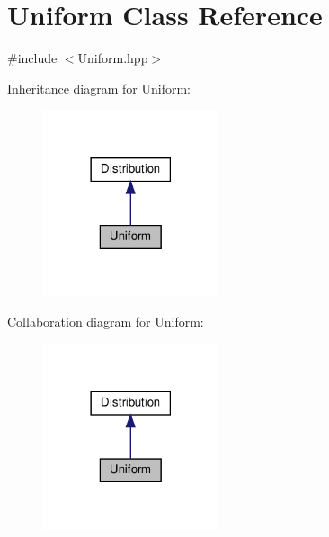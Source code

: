 \hypertarget{classUniform}{}\section{Uniform Class Reference}
\label{classUniform}


{\ttfamily \#include $<$Uniform.\+hpp$>$}



Inheritance diagram for Uniform\+:
\nopagebreak
\begin{figure}[H]
\begin{center}
\leavevmode
\includegraphics[width=146pt]{classUniform__inherit__graph}
\end{center}
\end{figure}


Collaboration diagram for Uniform\+:
\nopagebreak
\begin{figure}[H]
\begin{center}
\leavevmode
\includegraphics[width=146pt]{classUniform__coll__graph}
\end{center}
\end{figure}
